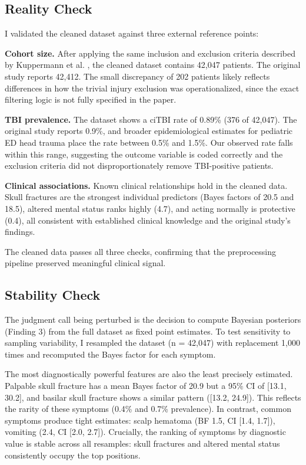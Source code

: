 \documentclass[11pt,letterpaper]{article}
\begin{document}
\subsection{Reality Check}\label{reality-check}

I validated the cleaned dataset against three external reference points:

\textbf{Cohort size.} After applying the same inclusion and exclusion criteria described by Kuppermann et al. \cite{Kuppermann2009}, the cleaned dataset contains 42,047 patients. The original study reports 42,412. The small discrepancy of 202 patients likely reflects differences in how the trivial injury exclusion was operationalized, since the exact filtering logic is not fully specified in the paper.

\textbf{TBI prevalence.} The dataset shows a ciTBI rate of 0.89\% (376 of 42,047). The original study reports 0.9\%, and broader epidemiological estimates for pediatric ED head trauma place the rate between 0.5\% and 1.5\%. Our observed rate falls within this range, suggesting the outcome variable is coded correctly and the exclusion criteria did not disproportionately remove TBI-positive patients.

\textbf{Clinical associations.} Known clinical relationships hold in the cleaned data. Skull fractures are the strongest individual predictors (Bayes factors of 20.5 and 18.5), altered mental status ranks highly (4.7), and acting normally is protective (0.4), all consistent with established clinical knowledge and the original study's findings.

The cleaned data passes all three checks, confirming that the preprocessing pipeline preserved meaningful clinical signal.



\subsection{Stability Check}\label{stability-check}
The judgment call being perturbed is the decision to compute Bayesian posteriors (Finding 3) from the full dataset as fixed point estimates. To test sensitivity to sampling variability, I resampled the dataset (n = 42,047) with replacement 1,000 times and recomputed the Bayes factor for each symptom.

The most diagnostically powerful features are also the least precisely estimated. Palpable skull fracture has a mean Bayes factor of 20.9 but a 95\% CI of [13.1, 30.2], and basilar skull fracture shows a similar pattern ([13.2, 24.9]). This reflects the rarity of these symptoms (0.4\% and 0.7\% prevalence). In contrast, common symptoms produce tight estimates: scalp hematoma (BF 1.5, CI [1.4, 1.7]), vomiting (2.4, CI [2.0, 2.7]). Crucially, the ranking of symptoms by diagnostic value is stable across all resamples: skull fractures and altered mental status consistently occupy the top positions.
\end{document}
